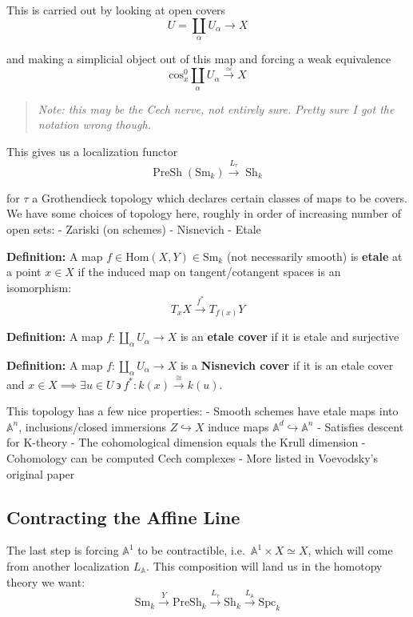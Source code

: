 \documentclass[11pt]{scrreprt}
\theoremstyle{definition}
\newcommand{\Af}[0]{{\mathbb{A}}}
\newcommand{\suchthat}[0]{{~\backepsilon ~}}
\newcommand{\mapsvia}[1]{\xrightarrow{#1}}
\newcommand{\Sm}[0]{{\text{Sm}_k}}
\newcommand{\homotopic}[0]{\simeq}
\newcommand{\cross}[0]{\times}
\newcommand{\injects}[0]{\hookrightarrow}
\renewcommand{\hom}[0]{\text{Hom}}
\begin{document}
This is carried out by looking at open covers \[
U = \coprod_{\alpha} U_\alpha \to X
\]

and making a simplicial object out of this map and forcing a weak
equivalence \[
\text{cos}^0_x \coprod_\alpha U_\alpha \mapsvia{\homotopic} X
\]

\begin{quote}\textit{
Note: this may be the Cech nerve, not entirely sure. Pretty sure I got
the notation wrong though.
}\end{quote}

This gives us a localization functor \[
\operatorname{PreSh}(\Sm) \mapsvia{L_\tau} \operatorname{Sh}_k
\]

for \(\tau\) a Grothendieck topology which declares certain classes of
maps to be covers. We have some choices of topology here, roughly in
order of increasing number of open sets: - Zariski (on schemes) -
Nisnevich - Etale

\textbf{Definition:} A map \(f\in \hom(X,Y) \in \Sm\) (not necessarily
smooth) is \textbf{etale} at a point \(x\in X\) if the induced map on
tangent/cotangent spaces is an isomorphism: \[
T_x X \mapsvia{f^*} T_{f(x)}Y
\]

\textbf{Definition:} A map \(f: \coprod_\alpha U_\alpha \to X\) is an
\textbf{etale cover} if it is etale and surjective

\textbf{Definition:} A map \(f: \coprod_\alpha U_\alpha \to X\) is a
\textbf{Nisnevich cover} if it is an etale cover and
\(x\in X \implies \exists u\in U \suchthat f^*: k(x) \mapsvia{\cong}k(u)\).

This topology has a few nice properties: - Smooth schemes have etale
maps into \(\Af^n\), inclusions/closed immersions \(Z \injects X\)
induce maps \(\Af^d \injects \Af^n\) - Satisfies descent for K-theory -
The cohomological dimension equals the Krull dimension - Cohomology can
be computed Cech complexes - More listed in Voevodsky's original paper

\hypertarget{contracting-the-affine-line}{%
\subsection{Contracting the Affine
Line}\label{contracting-the-affine-line}}

The last step is forcing \(\Af^1\) to be contractible,
i.e.~\(\Af^1 \cross X \homotopic X\), which will come from another
localization \(L_\Af\). This composition will land us in the homotopy
theory we want: \[
\Sm \mapsvia{Y} \text{PreSh}_k \mapsvia{L_\tau} \text{Sh}_k \mapsvia{L_{\Af}} \text{Spc}_k
\]
\end{document}
